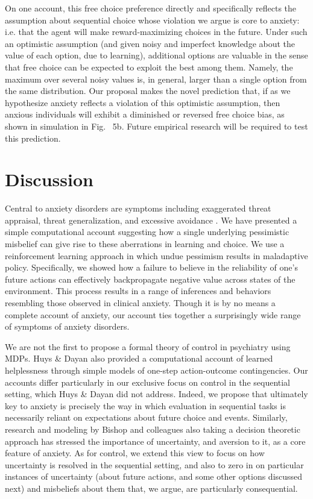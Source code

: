 \documentclass[11pt]{article} %
\begin{document}
On one account\citep{ly2019}, this free choice preference directly and specifically reflects the assumption about sequential choice whose violation we argue is core to anxiety: i.e. that the agent will make reward-maximizing choices in the future. Under such an optimistic assumption (and given noisy and imperfect knowledge about the value of each option, due to learning), additional options are valuable in the sense that free choice can be expected to exploit the best among them. Namely, the maximum over several noisy values is, in general, larger than a single option from the same distribution. Our proposal makes the novel prediction that, if as we hypothesize anxiety reflects a violation of this optimistic assumption, then anxious individuals will exhibit a diminished or reversed free choice bias, as shown in simulation in Fig. ~5b. Future empirical research will be required to test this prediction.

\section{Discussion}

Central to anxiety disorders are symptoms including exaggerated threat appraisal, threat generalization, and excessive avoidance \citep{ClarkBeck2011, dymond2015, Arnaudova2017}. We have presented a simple computational account suggesting how a single underlying pessimistic misbelief can give rise to these aberrations in learning and choice. We use a reinforcement learning approach in which undue pessimism results in maladaptive policy. Specifically, we showed how a failure to believe in the reliability of one's future actions can effectively backpropagate negative value across states of the environment. This process results in a range of inferences and behaviors resembling those observed in clinical anxiety. Though it is by no means a complete account of anxiety, our account ties together a surprisingly wide range of symptoms of anxiety disorders.

We are not the first to propose a formal theory of control in psychiatry using MDPs. Huys \& Dayan \cite{HuysDayan2009} also provided a computational account of learned helplessness through simple models of one-step action-outcome contingencies. Our accounts differ particularly in our exclusive focus on control in the sequential setting, which Huys \& Dayan did not address. Indeed, we propose that ultimately key to anxiety is precisely the way in which evaluation in sequential tasks is necessarily reliant on expectations about future choice and events. Similarly, research and modeling by Bishop and colleagues \citep{browning2015, gagne2018} also taking a decision theoretic approach has stressed the importance of uncertainty, and aversion to it, as a core feature of anxiety. As for control, we extend this view to focus on how  uncertainty is resolved in the sequential setting, and also to zero in on particular instances of uncertainty (about future actions, and some other options discussed next) and misbeliefs about them that, we argue, are particularly consequential.
\end{document}
